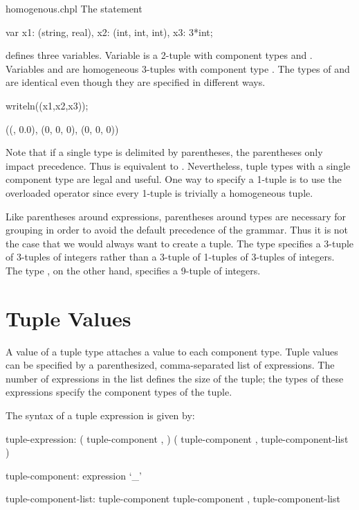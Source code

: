 \begin{chapelexample}{homogenous.chpl}
The statement
\begin{chapel}
var x1: (string, real),
    x2: (int, int, int),
    x3: 3*int;
\end{chapel}
defines three variables.  Variable  is a 2-tuple with
component types  and .  Variables 
and  are homogeneous 3-tuples with component type .
The types of  and  are identical even though they
are specified in different ways.
\begin{chapelpost}
writeln((x1,x2,x3));
\end{chapelpost}
\begin{chapeloutput}
((, 0.0), (0, 0, 0), (0, 0, 0))
\end{chapeloutput}
\end{chapelexample}

Note that if a single type is delimited by parentheses, the
parentheses only impact precedence.  Thus  is equivalent
to .  Nevertheless, tuple types with a single component type
are legal and useful.  One way to specify a 1-tuple is to use the
overloaded \chpl{*} operator since every 1-tuple is trivially a
homogeneous tuple.

\begin{rationale}
Like parentheses around expressions, parentheses around types are
necessary for grouping in order to avoid the default precedence of the
grammar.  Thus it is not the case that we would always want to create
a tuple.  The type  specifies a 3-tuple of 3-tuples of
integers rather than a 3-tuple of 1-tuples of 3-tuples of integers.
The type , on the other hand, specifies a 9-tuple of
integers.
\end{rationale}

\section{Tuple Values}
\label{Tuple_Values}

A value of a tuple type attaches a value to each component type.
Tuple values can be specified by a parenthesized, comma-separated list
of expressions.  The number of expressions in the list defines the
size of the tuple; the types of these expressions specify the
component types of the tuple.

The syntax of a tuple expression is given by:
\begin{syntax}
tuple-expression:
  ( tuple-component , )
  ( tuple-component , tuple-component-list )

tuple-component:
  expression
  `_'

tuple-component-list:
  tuple-component
  tuple-component , tuple-component-list
\end{syntax}

